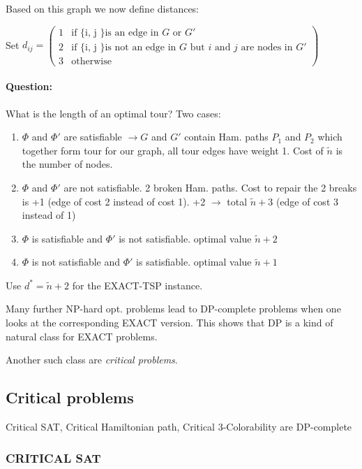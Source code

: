 \documentclass[11pt]{article}
\theoremstyle{definition}
\theoremstyle{definition}
\begin{document}
Based on this graph we now define distances:

Set $ d_{ij} = \begin{pmatrix}
	1 & \text{if \{i, j \} is an edge in } G \text{ or } G' \\
	2 & \text{if \{i, j \} is not an edge in } G \text{ but } i \text{ and } j \text{ are nodes in } G' \\
	3 & \text{otherwise}
	\end{pmatrix} $
	
\paragraph{Question:} What is the length of an optimal tour?
Two cases:
\begin{enumerate}
\item
	$ \Phi $ and $ \Phi' $ are satisfiable $ \rightarrow G $ and $ G' $ contain Ham. paths $ P_1 $ and $ P_2 $ which together form tour for our graph, all tour edges have weight 1. Cost of $ \tilde n $ is the number of nodes.
\item
	$ \Phi $ and $ \Phi' $ are not satisfiable. 2 broken Ham. paths. Cost to repair the 2 breaks is +1 (edge of cost 2 instead of cost 1). +2 $ \rightarrow $ total $ \tilde n + 3 $ (edge of cost 3 instead of 1)
\item
	$ \Phi $ is satisfiable and $ \Phi' $ is not satisfiable. optimal value $ \tilde n + 2 $
\item
	$ \Phi $ is not satisfiable and $ \Phi' $ is satisfiable. optimal value $ \tilde n + 1 $
\end{enumerate}

Use $ d^\ast = \tilde n + 2 $ for the EXACT-TSP instance.

Many further NP-hard opt. problems lead to DP-complete problems when one looks at the corresponding EXACT version. This shows that DP is a kind of natural class for EXACT problems.

Another such class are \textit{critical problems}.

\subsection{Critical problems}

Critical SAT, Critical Hamiltonian path, Critical 3-Colorability are DP-complete

\subsubsection{CRITICAL SAT}
\end{document}
